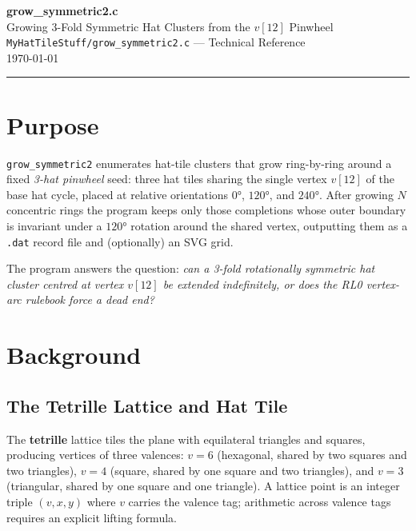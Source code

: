 \documentclass[10pt,a4paper]{article}
\let\polysection\section
\renewcommand\section{\needspace{0.16\textheight}\polysection}
\let\polysubsection\subsection
\renewcommand\subsection{\needspace{0.12\textheight}\polysubsection}
\newcommand{\code}[1]{\texttt{\small #1}}
\newcommand{\file}[1]{\texttt{\footnotesize #1}}
\begin{document}
\begin{center}
  {\Huge\bfseries\color{titlecolor} grow\_symmetric2.c}\\[4pt]
  {\large\color{headercolor} Growing 3-Fold Symmetric Hat Clusters from the $v[12]$ Pinwheel}\\[6pt]
  {\small \file{MyHatTileStuff/grow\_symmetric2.c} — Technical Reference}\\[2pt]
  {\small\color{gray} \today}
\end{center}

\vspace{6pt}
\noindent\rule{\linewidth}{1pt}
\vspace{4pt}

\section{Purpose}

\code{grow\_symmetric2} enumerates hat-tile clusters that grow ring-by-ring
around a fixed \emph{3-hat pinwheel} seed: three hat tiles sharing the
single vertex $v[12]$ of the base hat cycle, placed at relative orientations
$0°$, $120°$, and $240°$.  After growing $N$ concentric rings the program
keeps only those completions whose outer boundary is invariant under a $120°$
rotation around the shared vertex, outputting them as a \code{.dat} record
file and (optionally) an SVG grid.

\medskip
\noindent The program answers the question: \emph{can a 3-fold rotationally
symmetric hat cluster centred at vertex $v[12]$ be extended indefinitely, or
does the RL0 vertex-arc rulebook force a dead end?}

\section{Background}

\subsection{The Tetrille Lattice and Hat Tile}

The \textbf{tetrille} lattice tiles the plane with equilateral triangles and
squares, producing vertices of three valences: $v=6$ (hexagonal, shared by
two squares and two triangles), $v=4$ (square, shared by one square and two
triangles), and $v=3$ (triangular, shared by one square and one triangle).
A lattice point is an integer triple $(v, x, y)$ where $v$ carries the
valence tag; arithmetic across valence tags requires an explicit lifting
formula.
\end{document}
